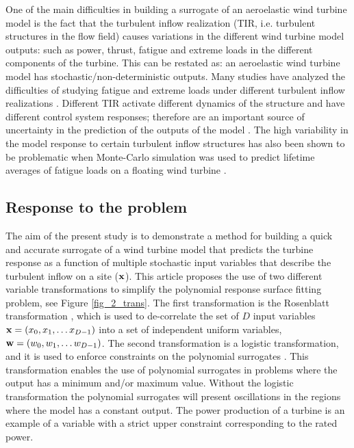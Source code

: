 \documentclass[preprint,12pt]{elsarticle}
\begin{document}
One of the main difficulties in building a surrogate of an aeroelastic wind turbine model is the fact that the turbulent inflow realization (TIR, i.e. turbulent structures in the flow field) causes variations in the different wind turbine model outputs: such as power, thrust, fatigue and extreme loads in the different components of the turbine. This can be restated as: an aeroelastic wind turbine model has stochastic/non-deterministic outputs. Many studies have analyzed the difficulties of studying fatigue and extreme loads under different turbulent inflow realizations \cite{moriarty2008database, natarajan2012outlier, tibaldi2014investigation, abdallah2016influence, toft2016assessment}. Different TIR activate different dynamics of the structure and have different control system responses; therefore are an important source of uncertainty in the prediction of the outputs of the model \cite{moriarty2008database}. The high variability in the model response to certain turbulent inflow structures has also been shown to be problematic when Monte-Carlo simulation was used to predict lifetime averages of fatigue loads on a floating wind turbine \cite{graf2015high}.


\subsection{Response to the problem}
The aim of the present study is to demonstrate a method for building a quick and accurate surrogate of a wind turbine model that predicts the turbine response as a function of multiple stochastic input variables that describe the turbulent inflow on a site ($\mathbf{x}$). This article proposes the use of two different variable transformations to simplify the polynomial response surface fitting problem, see Figure \ref{fig_2_trans}. The first transformation is the Rosenblatt transformation \cite{rosenblatt1952}, which is used to de-correlate the set of $D$ input variables $\mathbf{x} = (x_0, x_1, \ldots x_{D-1})$ into a set of independent uniform variables, $\mathbf{w} = (w_0, w_1, \ldots w_{D-1})$. The second transformation is a logistic transformation, and it is used to enforce constraints on the polynomial surrogates \cite{simard1998transformation}. This transformation enables the use of polynomial surrogates in problems where the output has a minimum and/or maximum value. Without the logistic transformation the polynomial surrogates will present oscillations in the regions where the model has a constant output. The power production of a turbine is an example of a variable with a strict upper constraint corresponding to the rated power.
\end{document}
